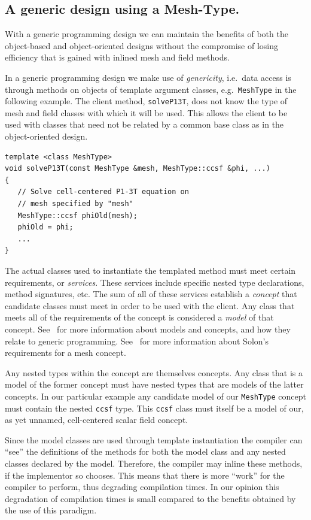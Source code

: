 \documentclass[reqno]{lanl}
\begin{document}
\subsection{A generic design using a Mesh-Type.}
With a generic programming design we can maintain the benefits of both the
object-based and object-oriented designs without the compromise of losing
efficiency that is gained with inlined mesh and field methods.

In a generic programming design we make use of \emph{genericity},
i.e.\ data access is through methods on objects of template argument
classes, e.g.\ \texttt{MeshType} in the following example.
The client method, \texttt{solveP13T}, does not know
the type of mesh and field classes with which it will be used.
This allows the client to be used with classes that need not be
related by a common base class as in the object-oriented design.
%
 \begin{verbatim}
template <class MeshType>
void solveP13T(const MeshType &mesh, MeshType::ccsf &phi, ...)
{
   // Solve cell-centered P1-3T equation on
   // mesh specified by "mesh"
   MeshType::ccsf phiOld(mesh);
   phiOld = phi;
   ...
}
\end{verbatim} \normalcolor
%
The actual classes used to instantiate the templated method must
meet certain requirements, or \emph{services}.
These services include specific nested type declarations, method signatures,
etc.
The sum of all of these services establish a \emph{concept} that candidate
classes must meet in order to be used with the client.
Any class that meets all of the requirements of the concept is considered
a \emph{model} of that concept.
See~\cite{Austern99}
for more information about models and concepts,
and how they relate to generic programming.
See~\cite{Pautz99}
for more information about Solon's requirements for a mesh concept.

Any nested types within the concept are themselves concepts.
Any class that is a model of the former concept must have nested types
that are models of the latter concepts.
In our particular example any candidate model of our \texttt{MeshType}
concept must contain the nested \texttt{ccsf} type.
This \texttt{ccsf} class must itself be a model of our, as yet unnamed, 
cell-centered scalar field concept.

Since the model classes are used through template instantiation the
compiler can ``see'' the definitions of the methods for both the
model class and any nested classes declared by the model.
Therefore, the compiler may inline these methods, if the implementor
so chooses.
This means that there is more ``work'' for the compiler to perform,
thus degrading compilation times.
In our opinion this degradation of compilation times is small compared
to the benefits obtained by the use of this paradigm.
\end{document}
